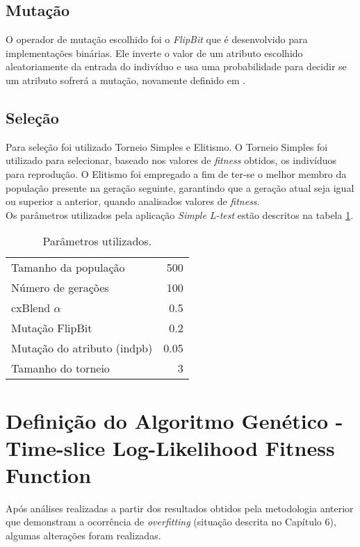 \subsection{Mutação}

O operador de mutação escolhido foi o {\it FlipBit} que é desenvolvido para implementações binárias. Ele inverte o valor de um atributo escolhido aleatoriamente da entrada do indivíduo e usa uma probabilidade para decidir se um atributo sofrerá a mutação, novamente definido em \citep{Goldberg:1989:GAS:534133}.


\subsection{Seleção}

Para seleção foi utilizado Torneio Simples e Elitismo. O Torneio Simples foi utilizado para selecionar, baseado nos valores de {\it fitness} obtidos, os indivíduos para reprodução. O Elitismo foi empregado a fim de ter-se o melhor membro da população presente na geração seguinte, garantindo que a geração atual seja igual ou superior a anterior, quando analisados valores de {\it fitness}.\\

Os parâmetros utilizados pela aplicação {\it Simple L-test} estão descritos na tabela \ref{GAParameters}.\\

\begin{table}[!h]
  \begin{center}
  \begin{tabular}{|l|r|}
    \hline
    Tamanho da população & 500\\
    Número de gerações & 100\\
    cxBlend $\alpha$ & 0.5\\
    Mutação FlipBit & 0.2\\
    Mutação do atributo (indpb) & 0.05 \\
    Tamanho do torneio & 3\\
    \hline    
  \end{tabular}
  \end{center}
  \caption{Parâmetros utilizados.}
  \label{GAParameters}
\end{table}

\section{Definição do Algoritmo Genético - Time-slice Log-Likelihood Fitness Function}
Após análises realizadas a partir dos resultados obtidos pela metodologia anterior que demonstram a ocorrência de {\it overfitting} (situação descrita no Capítulo 6), algumas alterações foram realizadas.\\

